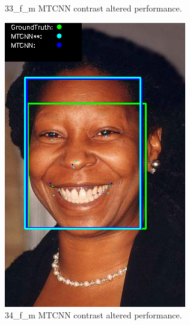 \documentclass{l4proj}
\begin{document}
\begin{appendices}
\begin{figure}[h!]
\begin{minipage}{0.49\textwidth}
    \caption{33\_f\_m MTCNN contrast altered performance.}
    \label{whoopi_result}
  \end{minipage}
\end{figure}
\begin{figure}[h!]
  \centering
  \begin{minipage}{0.49\textwidth}
    \centering
     \includegraphics[width=\textwidth]{images/mtcnn/34.png}
    \caption{34\_f\_m MTCNN contrast altered performance.}
    \label{whoopi_result}
  \end{minipage}
    \hfill
\end{figure}





\end{appendices}






\end{document}
